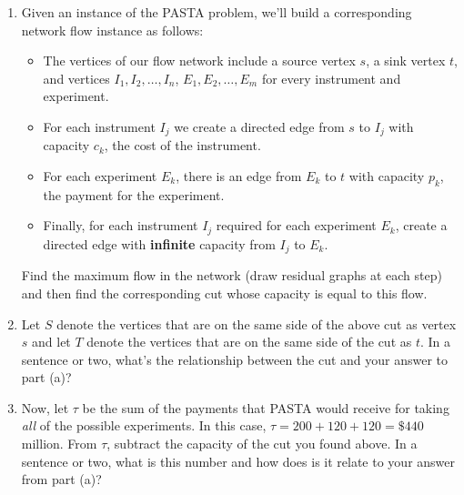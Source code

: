 \documentclass[12 pt, letterpaper]{hmcpset}
\begin{document}
\begin{problem}
\begin{enumerate}
        \item Given an instance of the PASTA problem, we'll build a corresponding network flow instance as follows:
        \begin{itemize}
            \item The vertices of our flow network include a source vertex $s$, a sink vertex $t$, and vertices $I_{1}, I_{2}, \ldots, I_{n}$,  $E_{1}, E_{2}, \ldots, E_{m}$ for every instrument and experiment.
            \item For each instrument $I_j$ we create a directed edge from $s$ to $I_j$ with capacity $c_k$, the cost of the instrument.
            \item For each experiment $E_k$, there is an edge from $E_k$ to $t$ with capacity $p_k$, the payment for the experiment.
            \item Finally, for each instrument $I_j$ required for each experiment $E_k$, create a directed edge with \textbf{infinite} capacity from $I_j$ to $E_k$.
        \end{itemize}
	Find the maximum flow in the network (draw residual graphs at each step) and then find the corresponding cut whose capacity is equal to this flow.

       	\item Let $S$ denote the vertices that are on the same side of the above cut as vertex $s$ and let $T$ denote the vertices that are on the same side of the cut as $t$. In a sentence or two, what's the relationship between the cut and your answer to part (a)?

        \item Now, let $\tau$ be the sum of the payments that PASTA would receive for taking \emph{all} of the possible experiments.  In this case, $\tau = 200 + 120 + 120 = \$440$ million.  From $\tau$, subtract the capacity of the cut you found above. In a sentence or two, what is this number and how does is it relate to your answer from part (a)?
\end{enumerate}
\end{problem}
\end{document}
